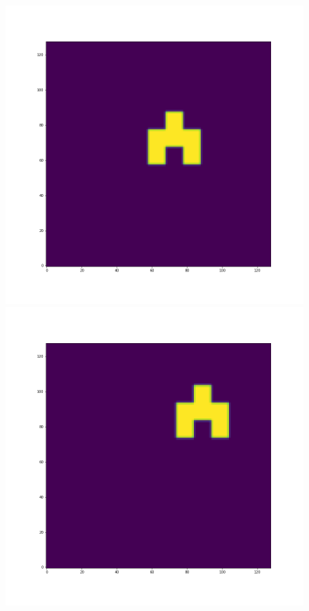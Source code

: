 \documentclass[12pt,a4paper]{article}
\begin{document}
\begin{figure}[H]
\centering
\begin{minipage}{.3\textwidth}
  \centering
  \includegraphics[width=\linewidth]{Pictures/Solve2DWhiteBearMovementTestTHINC/Solve2DWhiteBearMovementTest_t30.png}
\end{minipage}%
\begin{minipage}{.3\textwidth}
  \centering
  \includegraphics[width=\linewidth]{Pictures/Solve2DWhiteBearMovementTestTHINC/Solve2DWhiteBearMovementTest_t40.png}

\end{minipage}
\end{figure}
\end{document}
